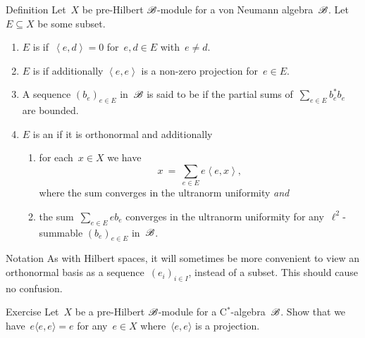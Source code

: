 \begin{parsec}%
\begin{point}{Definition}
    Let~$X$ be pre-Hilbert $\mathscr{B}$-module
        for a von Neumann algebra~$\mathscr{B}$.
    Let~$E \subseteq X$ be some subset.
    \begin{enumerate}
        \item $E$ is  if~$\left<e,d\right> = 0$
            for~$e,d \in E$ with~$e \neq d$.
        \item $E$ is  if additionally
                    $\left<e,e\right>$ is a non-zero projection
                    for~$e \in E$.
        \item A sequence $(b_e)_{e \in E}$ in~$\mathscr{B}$
                is said to be 
                if the partial sums of~$\sum_{e \in E} b_e^*b_e$
                are bounded.
        \item $E$ is an  if
                it is orthonormal and additionally
            \begin{enumerate}
                \item for each~$x \in X$ we have
                    \begin{equation*}
                        x \ =\  \sum_{e \in E} e\left<e,x\right>,
                    \end{equation*}
                    where the sum converges in the ultranorm uniformity
                    \emph{and}
                \item  the sum~$\sum_{e \in E} eb_e$
                        converges in the ultranorm uniformity
                    for any~$\ell^2$-summable $(b_e)_{e \in E}$
                        in~$\mathscr{B}$.
            \end{enumerate}
    \end{enumerate}
\begin{point}{Notation}%
As with Hilbert spaces, it will sometimes be more convenient
    to view an orthonormal basis as a sequence~$(e_i)_{i \in I}$,
    instead of a subset. This should cause no confusion.
\end{point}
\end{point}
\begin{point}{Exercise}%
Let~$X$ be a pre-Hilbert $\mathscr{B}$-module for a C$^*$-algebra~$\mathscr{B}$.
Show that we have~$ e \langle e,e \rangle = e$
    for any~$e \in X$
   where~$\langle e, e\rangle$ is a projection.

\end{point}
\end{parsec}
